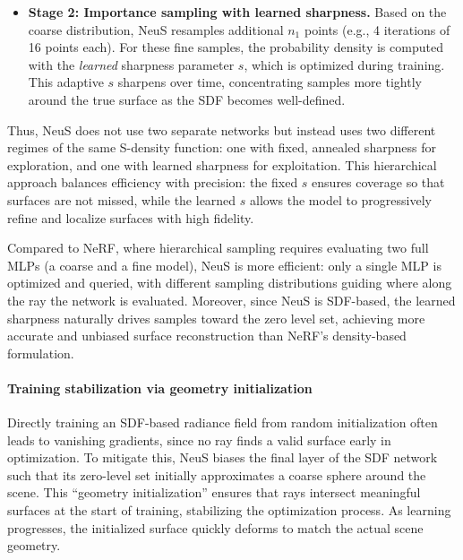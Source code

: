 \begin{enrichment}
\begin{enrichment}
\begin{itemize}
            \item \textbf{Stage 2: Importance sampling with learned sharpness.}  
            Based on the coarse distribution, NeuS resamples additional \(n_1\) points (e.g., 4 iterations of 16 points each). For these fine samples, the probability density is computed with the \emph{learned} sharpness parameter \(s\), which is optimized during training. This adaptive \(s\) sharpens over time, concentrating samples more tightly around the true surface as the SDF becomes well-defined.
        \end{itemize}
        
        Thus, NeuS does not use two separate networks but instead uses two different regimes of the same S-density function: one with fixed, annealed sharpness for exploration, and one with learned sharpness for exploitation. This hierarchical approach balances efficiency with precision: the fixed \(s\) ensures coverage so that surfaces are not missed, while the learned \(s\) allows the model to progressively refine and localize surfaces with high fidelity.
        
        Compared to NeRF, where hierarchical sampling requires evaluating two full MLPs (a coarse and a fine model), NeuS is more efficient: only a single MLP is optimized and queried, with different sampling distributions guiding where along the ray the network is evaluated. Moreover, since NeuS is SDF-based, the learned sharpness naturally drives samples toward the zero level set, achieving more accurate and unbiased surface reconstruction than NeRF’s density-based formulation.
        
        \paragraph{Training stabilization via geometry initialization}
        Directly training an SDF-based radiance field from random initialization often leads to vanishing gradients, since no ray finds a valid surface early in optimization. To mitigate this, NeuS biases the final layer of the SDF network such that its zero-level set initially approximates a coarse sphere around the scene. This ``geometry initialization'' ensures that rays intersect meaningful surfaces at the start of training, stabilizing the optimization process. As learning progresses, the initialized surface quickly deforms to match the actual scene geometry.
        
        \newpage
        

\end{enrichment}
\end{enrichment}

